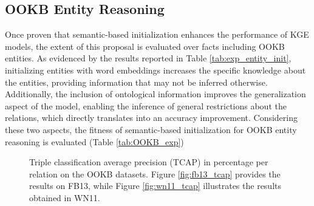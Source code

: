 \subsection{OOKB Entity Reasoning}
Once proven that semantic-based initialization enhances the performance of KGE models, the extent of this proposal is evaluated over facts including OOKB entities. As evidenced by the results reported in Table \ref{tab:exp_entity_init}, initializing entities with word embeddings increases the specific knowledge about the entities, providing information that may not be inferred otherwise. Additionally, the inclusion of ontological information improves the generalization aspect of the model, enabling the inference of general restrictions about the relations, which directly translates into an accuracy improvement. Considering these two aspects, the fitness of semantic-based initialization for OOKB entity reasoning is evaluated (Table \ref{tab:OOKB_exp})

\begin{figure}[t!]
    \centering
    \caption{Triple classification average precision (TCAP) in percentage per relation on the OOKB datasets. Figure \ref{fig:fb13_tcap} provides the results on FB13, while Figure \ref{fig:wn11_tcap} illustrates the results obtained in WN11.}
    \label{fig:tcap_OOKB}
\end{figure}

